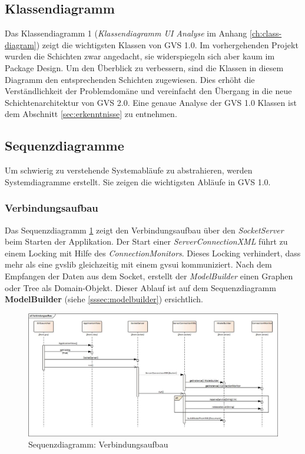 \documentclass[11pt,a4paper,english,oneside]{book}
\numberwithin{equation}{chapter}
\begin{document}
	\subsection{Klassendiagramm} \label{ssec:klassendiagramm-1}
	Das Klassendiagramm 1 (\textit{Klassendiagramm UI Analyse} im Anhang \ref{ch:class-diagram}) zeigt die wichtigsten Klassen von GVS 1.0. Im vorhergehenden Projekt wurden die Schichten zwar angedacht, sie widerspiegeln sich aber kaum im Package Design. Um den Überblick zu verbessern, sind die Klassen in diesem Diagramm den entsprechenden Schichten zugewiesen. Dies erhöht die Verständlichkeit der Problemdomäne und vereinfacht den Übergang in die neue Schichtenarchitektur von GVS 2.0. Eine genaue Analyse der GVS 1.0 Klassen ist dem Abschnitt \ref{sec:erkenntnisse} zu entnehmen. 
		
	\subsection{Sequenzdiagramme} \label{ssec:sequence-1}
	Um schwierig zu verstehende Systemabläufe zu abstrahieren, werden Systemdiagramme erstellt. Sie zeigen die wichtigsten Abläufe in GVS 1.0.
	
	\subsubsection{Verbindungsaufbau}
	Das Sequenzdiagramm	\ref{fig:sd-verbindungsaufbau} zeigt den Verbindungsaufbau über den \textit{SocketServer} beim Starten der Applikation. Der Start einer \textit{ServerConnectionXML} führt zu einem Locking mit Hilfe des \textit{ConnectionMonitors}. Dieses Locking verhindert, dass mehr als eine \gls{gvslib} gleichzeitig mit einem \gls{gvsui} kommuniziert. Nach dem Empfangen der Daten aus dem Socket, erstellt der \textit{ModelBuilder} einen Graphen oder Tree als Domain-Objekt. Dieser Ablauf ist auf dem Sequenzdiagramm \textbf{ModelBuilder} (siehe \ref{sssec:modelbuilder}) ersichtlich.
	\begin{figure}[h!]
		\centering
		\includegraphics[width=\linewidth]{assets/images/verbindungsaufbau}
		\caption{Sequenzdiagramm: Verbindungsaufbau}
		\label{fig:sd-verbindungsaufbau}
	\end{figure}
\end{document}
